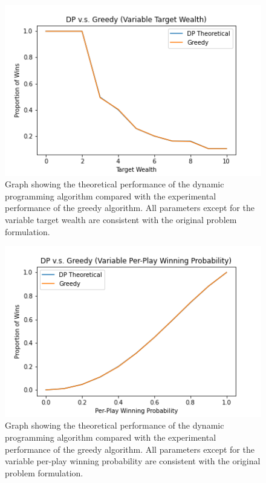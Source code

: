 \documentclass[conference]{IEEEtran}
\begin{document}
\begin{figure}[htbp]
\includegraphics[width=\columnwidth]{dp-vs-greedy-variable-target-wealth.png}
\caption{Graph showing the theoretical performance of the dynamic programming algorithm compared with the experimental performance of the greedy algorithm. All parameters except for the variable target wealth are consistent with the original problem formulation.}
\label{dp-vs-greedy-variable-target-wealth}
\end{figure}

\begin{figure}[htbp]
\includegraphics[width=\columnwidth]{dp-vs-greedy-variable-per-play-winning-prob.png}
\caption{Graph showing the theoretical performance of the dynamic programming algorithm compared with the experimental performance of the greedy algorithm. All parameters except for the variable per-play winning probability are consistent with the original problem formulation.}
\label{dp-vs-greedy-variable-per-play-winning-prob}
\end{figure}
\end{document}
